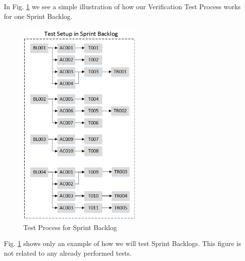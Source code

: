 \newpage
In Fig. \ref{fig:testsetup2} we see a simple illustration of how our Verification Test Process works for one Sprint Backlog.

\begin{figure}[h]
    \centering
        \includegraphics[width=0.55\textwidth]{VAPIQ-PICTURES/testdocbild2}
        \caption{Test Process for Sprint Backlog}
        \label{fig:testsetup2}
\end{figure}
\noindent
Fig. \ref{fig:testsetup2} shows only an example of how we will test Sprint Backlogs. This figure is not related to any already performed tests.\\
\newpage